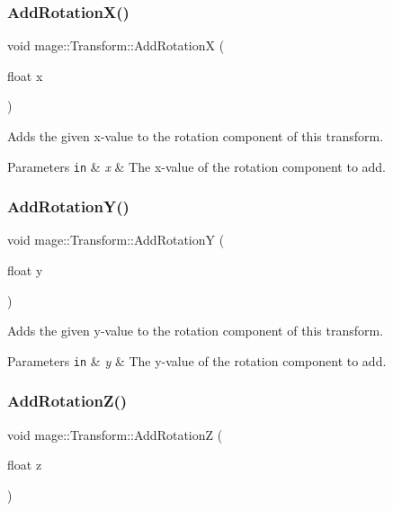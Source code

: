 \subsubsection{\texorpdfstring{Add\+Rotation\+X()}{AddRotationX()}}
{\footnotesize\ttfamily void mage\+::\+Transform\+::\+Add\+RotationX (\begin{DoxyParamCaption}\item[{float}]{x }\end{DoxyParamCaption})}

Adds the given x-\/value to the rotation component of this transform.


\begin{DoxyParams}[1]{Parameters}
\mbox{\tt in}  & {\em x} & The x-\/value of the rotation component to add. \\
\hline
\end{DoxyParams}
\hypertarget{structmage_1_1_transform_afc958d2361a5606962b51646825287e2}{}\label{structmage_1_1_transform_afc958d2361a5606962b51646825287e2} 
\subsubsection{\texorpdfstring{Add\+Rotation\+Y()}{AddRotationY()}}
{\footnotesize\ttfamily void mage\+::\+Transform\+::\+Add\+RotationY (\begin{DoxyParamCaption}\item[{float}]{y }\end{DoxyParamCaption})}

Adds the given y-\/value to the rotation component of this transform.


\begin{DoxyParams}[1]{Parameters}
\mbox{\tt in}  & {\em y} & The y-\/value of the rotation component to add. \\
\hline
\end{DoxyParams}
\hypertarget{structmage_1_1_transform_ae70e192a7d98366b629c3d75a7d2d3bd}{}\label{structmage_1_1_transform_ae70e192a7d98366b629c3d75a7d2d3bd} 
\subsubsection{\texorpdfstring{Add\+Rotation\+Z()}{AddRotationZ()}}
{\footnotesize\ttfamily void mage\+::\+Transform\+::\+Add\+RotationZ (\begin{DoxyParamCaption}\item[{float}]{z }\end{DoxyParamCaption})}

